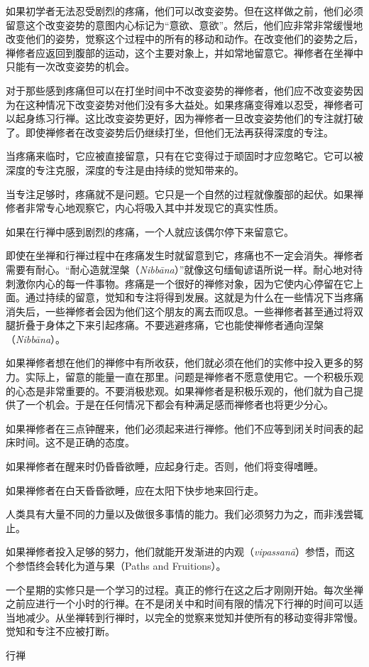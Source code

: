 如果初学者无法忍受剧烈的疼痛，他们可以改变姿势。但在这样做之前，他们必须留意这个改变姿势的意图内心标记为“意欲、意欲”。然后，他们应非常非常缓慢地改变他们的姿势，觉察这个过程中的所有的移动和动作。在改变他们的姿势之后，禅修者应返回到腹部的运动，这个主要对象上，并如常地留意它。禅修者在坐禅中只能有一次改变姿势的机会。

对于那些感到疼痛但可以在打坐时间中不改变姿势的禅修者，他们应不改变姿势因为在这种情况下改变姿势对他们没有多大益处。如果疼痛变得\1难以忍受，禅修者可以起身练习行禅。这比改变姿势更好，因为禅修者一旦改变姿势他们的专注就打破了。即使禅修者在改变姿势后仍继续打坐，但他们无法再获得深度的专注。

当疼痛来临时，它应被直接留意，只有在它变得过于顽固时才应忽略它。它可以被深度的专注克服，深度的专注是由持续的觉知带来的。

当专注足够时，疼痛就不是问题。它只是一个自然的过程就像腹部的起伏。如果禅修者非常专心地观察它，内心将吸入其中并发现它的真实性质。

如果在行禅中感到剧烈的疼痛，一个人就应该偶尔停下来留意它。

即使在坐禅和行禅过程中在疼痛发生时就留意到它，疼痛也不一定会消失。禅修者需要有耐心。“耐心造就涅槃（{\it Nibb\=ana}）”就像这句缅甸谚语所说一样。耐心地对待刺激你内心的每一件事物。疼痛是一个很好的禅修对象，因为它使内心停留在它上面。通过持续的留意，觉知和专注将得到发展。这就是为什么在一些情况下当疼痛消失后，一些禅修者会因为他们这个朋友的离去而叹息。一些禅修者甚至通过将双腿折叠于身体之下来引起疼痛。不要逃避疼痛，它也能使禅修者通向涅槃（{\it Nibb\=ana}）。

如果禅修者想在他们的禅修中有所收获，他们就必须在他们的实修中投入更多的努力。实际上，留意的能量一直在那里。问题是禅修者不愿意使用它。一个积极乐观的心态是非常重要的。不要消极悲观。如果禅修者是积极乐观的，他们就为自己提供了一个\1机会。于是在任何情况下都会有种满足感而禅修者也将更少分心。

如果禅修者在三点钟醒来，他们必须起来进行禅修。他们不应等到闭关时间表的起床时间。这不是正确的态度。

如果禅修者在醒来时仍昏昏欲睡，应起身行走。否则，他们将变得嗜睡。

如果禅修者在白天昏昏欲睡，应在太阳下快步地来回行走。

人类具有大量不同的力量以及做很多事情的能力。我们必须努力为之，而非浅尝辄止。

如果禅修者投入足够的努力，他们就能开发渐进的内观（{\it vipassan\=a}）参悟，而这个参悟终会转化为道与果（Paths and Fruitions）。

一个星期的实修只是一个学习的过程。真正的修行在这之后才刚刚开始。每次坐禅之前应进行一个小时的行禅。在不是闭关中和时间有限的情况下行禅的时间可以适当地减少。从坐禅转到行禅时，以完全的觉察来觉知并使所有的移动变得非常慢。觉知和专注不应被打断。

\sssubsectnonib 行禅

\endchapter

\byebye
